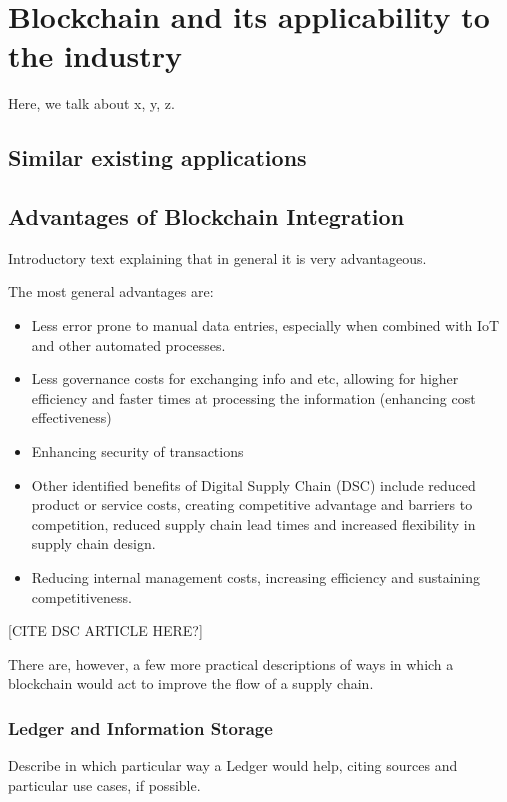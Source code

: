 \chapter{Blockchain and its applicability to the industry}
\label{chap:blockchain-applicability}

Here, we talk about x, y, z.

\section{Similar existing applications}

\section{Advantages of Blockchain Integration}
Introductory text explaining that in general it is very advantageous.

The most general advantages are:

\begin{itemize}
\item Less error prone to manual data entries, especially when combined with IoT and other automated processes.
\item Less governance costs for exchanging info and etc, allowing for higher efficiency and faster times at processing the information (enhancing cost effectiveness)
 \item Enhancing security of transactions
\item Other identified benefits of Digital Supply Chain (DSC) include reduced
product or service costs, creating competitive
advantage and barriers to competition, reduced supply
chain lead times and increased flexibility in supply
chain design. %
\item Reducing internal management costs, increasing efficiency and sustaining
competitiveness.
\end{itemize}

[CITE DSC ARTICLE HERE?]

There are, however, a few more practical descriptions of ways in which a blockchain would act to improve the flow of a supply chain.

\subsection{Ledger and Information Storage}
Describe in which particular way a Ledger would help, citing sources and particular use cases, if possible.
      
